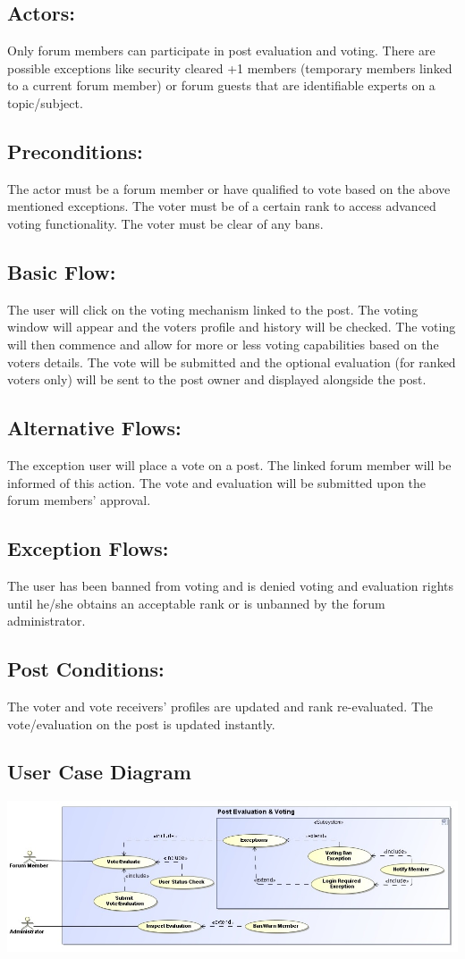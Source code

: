 \documentclass[12pt, oneside]{book}
\begin{document}
\subsection{Actors:} 
Only forum members can participate in post evaluation and voting. There are possible exceptions like security cleared +1 members (temporary members linked to a current forum member) or forum guests that are identifiable experts   on a topic/subject. 
\subsection{Preconditions:} 
The actor must be a forum member or have qualified to vote based on the above mentioned exceptions. The voter must be of a certain rank to access advanced voting functionality. The voter must be clear of any bans. 
\subsection{Basic Flow:} 
The user will click on the voting mechanism linked to the post. The voting window will appear and the voters profile and history will be checked. The voting will then commence and allow for more or less voting capabilities based on the voters details. The vote will be submitted and the optional evaluation (for ranked voters only) will be sent to the post owner and displayed alongside the post.
\subsection{Alternative Flows:} 
The exception user will place a vote on a post. The linked forum member will be informed of this action. The vote and evaluation will be submitted upon the forum members’ approval. 
\subsection{Exception Flows:} 
The user has been banned from voting and is denied voting and evaluation rights until he/she obtains an acceptable rank or is unbanned by the forum administrator.
\subsection{Post Conditions:} 
The voter and vote receivers’ profiles are updated and rank re-evaluated. The vote/evaluation on the post is updated instantly. 
\subsection{User Case Diagram}
\begin{center}
\includegraphics[scale=0.4]{PostVoteAndEvaluation.png}
\end{center}
\end{document}

